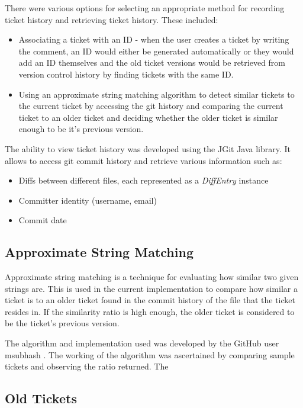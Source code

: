 \documentclass{4thYearProject}
\begin{document}
There were various options for selecting an appropriate method for recording ticket history and retrieving ticket history. These included:

\begin{itemize}
\item Associating a ticket with an ID - when the user creates a ticket by writing the comment, an ID would either be generated automatically or they would add an ID themselves and the old ticket versions would be retrieved from version control history by finding tickets with the same ID.
\item Using an approximate string matching algorithm to detect similar tickets to the current ticket by accessing the git history and comparing the current ticket to an older ticket and deciding whether the older ticket is similar enough to be it's previous version. 
\end{itemize}

The ability to view ticket history was developed using the JGit Java library. It allows to access git commit history and retrieve various information such as:

\begin{itemize}
\item Diffs between different files, each represented as a \textit{DiffEntry} instance
\item Committer identity (username, email)
\item Commit date
\end{itemize}

\subsection{Approximate String Matching}

Approximate string matching is a technique for evaluating how similar two given strings are. This is used in the current implementation to compare how similar a ticket is to an older ticket found in the commit history of the file that the ticket resides in. If the similarity ratio is high enough, the older ticket is considered to be the ticket's previous version. 

The algorithm and implementation used was developed by the GitHub user msubhash \cite{fuzzywuzzy}. The working of the algorithm was ascertained by comparing sample tickets and observing the ratio returned. The 

\subsection{Old Tickets}
\end{document}
